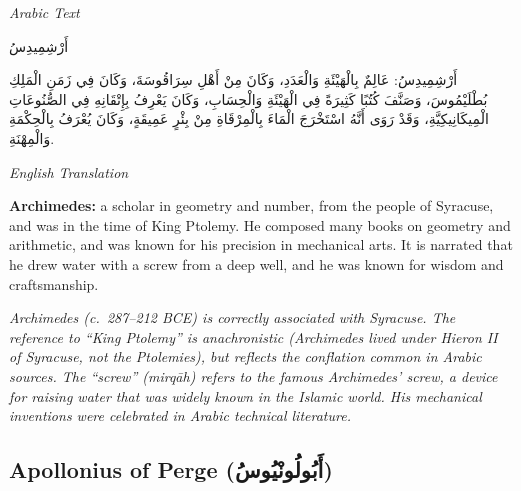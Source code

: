 \documentclass[11pt,a4paper]{article}
\def\RL#1{\beginR#1\endR}
\newcommand{\cnote}[1]{\textcolor{notecolor}{\textit{#1}}}
\newcommand{\textarabic}[1]{{\arabicfont\RL{#1}}}
\newenvironment{arabiccol}{%
  \begin{minipage}[t]{0.48\textwidth}%
  \begin{tcolorbox}[colback=leftbg,colframe=rulecolor,boxrule=0.4pt,arc=2pt,left=5pt,right=5pt,top=5pt,bottom=5pt]%
  \centering\textit{\footnotesize Arabic Text}\\[0.4em]%
  \raggedright\arabicfont\small%
}{%
  \end{tcolorbox}%
  \end{minipage}%
}
\newenvironment{englishcol}{%
  \begin{minipage}[t]{0.48\textwidth}%
  \begin{tcolorbox}[colback=rightbg,colframe=rulecolor,boxrule=0.4pt,arc=2pt,left=5pt,right=5pt,top=5pt,bottom=5pt]%
  \centering\textit{\footnotesize English Translation}\\[0.4em]%
  \raggedright\small%
}{%
  \end{tcolorbox}%
  \end{minipage}%
}
\begin{document}
\noindent
\begin{arabiccol}
\beginR
أَرْشِمِيدِسُ

أَرْشِمِيدِسُ: عَالِمٌ بِالْهَيْئَةِ وَالْعَدَدِ، وَكَانَ مِنْ أَهْلِ سِرَاقُوسَةَ، وَكَانَ فِي زَمَنِ الْمَلِكِ بُطْلَيْمُوسَ، وَصَنَّفَ كُتُبًا كَثِيرَةً فِي الْهَيْئَةِ وَالْحِسَابِ، وَكَانَ يَعْرِفُ بِإِتْقَانِهِ فِي الصُّنُوعَاتِ الْمِيكَانِيكِيَّةِ، وَقَدْ رَوَى أَنَّهُ اسْتَخْرَجَ الْمَاءَ بِالْمِرْقَاةِ مِنْ بِئْرٍ عَمِيقَةٍ، وَكَانَ يُعْرَفُ بِالْحِكْمَةِ وَالْمِهْنَةِ.
\endR
\end{arabiccol}
\hfill
\begin{englishcol}
\textbf{Archimedes:} a scholar in geometry and number, from the people of Syracuse, and was in the time of King Ptolemy. He composed many books on geometry and arithmetic, and was known for his precision in mechanical arts. It is narrated that he drew water with a screw from a deep well, and he was known for wisdom and craftsmanship.

\cnote{Archimedes (c.~287--212 BCE) is correctly associated with Syracuse. The reference to ``King Ptolemy'' is anachronistic (Archimedes lived under Hieron II of Syracuse, not the Ptolemies), but reflects the conflation common in Arabic sources. The ``screw'' (\textit{mirqāh}) refers to the famous Archimedes' screw, a device for raising water that was widely known in the Islamic world. His mechanical inventions were celebrated in Arabic technical literature.}
\end{englishcol}

\par\vspace{0.5em}

\subsection{Apollonius of Perge (\textarabic{أَبُولُونْيُوسُ})}
\end{document}
